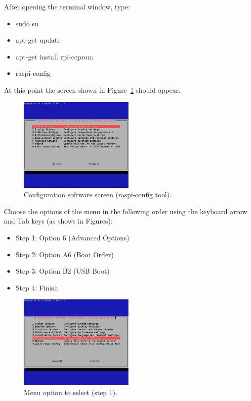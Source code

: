 \documentclass[11pt,a4paper]{article}
\begin{document}
After opening the terminal window, type:

\begin{itemize}
\item sudo su
\item apt-get update
\item apt-get install rpi-eeprom
\item raspi-config
\end{itemize}

At this point the screen shown in Figure~\ref{fig:screen3} should appear.

\begin{figure}[!ht]
  \centering
  \includegraphics[width=0.5\textwidth]{pictures/screen3.jpg}
  \caption{Configuration software screen (raspi-config tool).}
  \label{fig:screen3}
\end{figure}

Choose the options of the menu in the following order using the keyboard arrow and Tab keys (as shows in Figures):
\begin{itemize}
\item Step 1: Option 6 (Advanced Options)
\item Step 2: Option A6 (Boot Order)
\item Step 3: Option B2 (USB Boot)
\item Step 4: Finish
\end{itemize}

\begin{figure}[H]
  \centering
  \includegraphics[width=0.5\textwidth]{pictures/screen4.jpg}
  \caption{Menu option to select (step 1).}
  \label{fig:screen4}
\end{figure}
\end{document}
